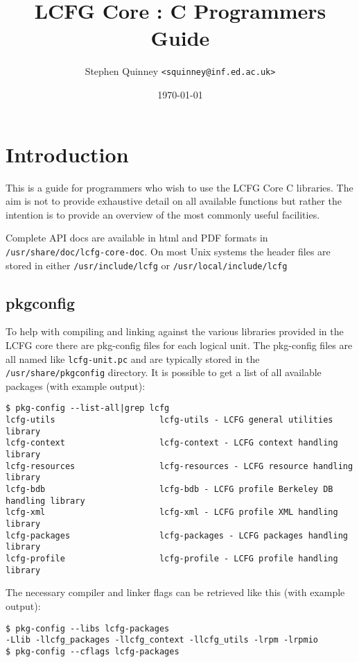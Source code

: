 \documentclass[11pt,a4paper,titlepage]{article}
\title{LCFG Core : C Programmers Guide}
\author{Stephen Quinney \texttt{<squinney@inf.ed.ac.uk>}}
\date{\today}
\begin{document}
\maketitle

\tableofcontents
\clearpage

\section{Introduction}

This is a guide for programmers who wish to use the LCFG Core C
libraries. The aim is not to provide exhaustive detail on all available
functions but rather the intention is to provide an overview of the
most commonly useful facilities. 

Complete API docs are available in html and PDF formats in
\texttt{/usr/share/doc/lcfg-core-doc}. On most Unix systems the header
files are stored in either \texttt{/usr/include/lcfg} or
\texttt{/usr/local/include/lcfg}

\subsection{pkgconfig}

To help with compiling and linking against the various libraries
provided in the LCFG core there are pkg-config files for each logical
unit. The pkg-config files are all named like \texttt{lcfg-unit.pc}
and are typically stored in the \texttt{/usr/share/pkgconfig}
directory. It is possible to get a list of all available packages
(with example output):

\begin{verbatim}
$ pkg-config --list-all|grep lcfg
lcfg-utils                     lcfg-utils - LCFG general utilities library
lcfg-context                   lcfg-context - LCFG context handling library
lcfg-resources                 lcfg-resources - LCFG resource handling library
lcfg-bdb                       lcfg-bdb - LCFG profile Berkeley DB handling library
lcfg-xml                       lcfg-xml - LCFG profile XML handling library
lcfg-packages                  lcfg-packages - LCFG packages handling library
lcfg-profile                   lcfg-profile - LCFG profile handling library
\end{verbatim}

The necessary compiler and linker flags can be retrieved like this
(with example output):

\begin{verbatim}
$ pkg-config --libs lcfg-packages
-Llib -llcfg_packages -llcfg_context -llcfg_utils -lrpm -lrpmio
$ pkg-config --cflags lcfg-packages
\end{verbatim}
\end{document}
